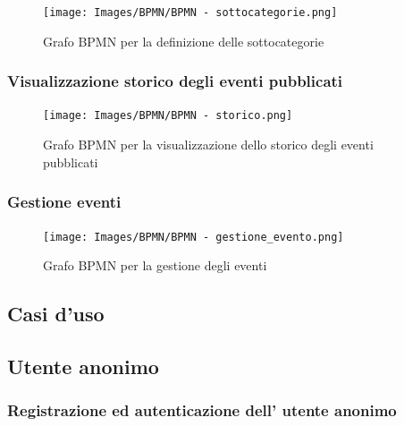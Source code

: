 \documentclass{article}
\begin{document}
\begin{figure}[htbp]
    \label{7.2.1}
    \centering
    \texttt{[image: Images/BPMN/BPMN - sottocategorie.png]}
    \caption{Grafo BPMN per la definizione delle sottocategorie}
\end{figure}
\clearpage

\subsubsection{Visualizzazione storico degli eventi pubblicati}

\begin{figure}[htbp]
    \label{7.2.2}
    \centering
    \texttt{[image: Images/BPMN/BPMN - storico.png]}
    \caption{Grafo BPMN per la visualizzazione dello storico degli eventi pubblicati}
\end{figure}
\clearpage

\subsubsection{Gestione eventi}

\begin{figure}[htbp]
    \label{7.2.3}
    \centering
    \texttt{[image: Images/BPMN/BPMN - gestione\_evento.png]}
    \caption{Grafo BPMN per la gestione degli eventi}
\end{figure}

\clearpage

\subsection{Casi d'uso}

\subsection{Utente anonimo}

\subsubsection{Registrazione ed autenticazione dell' utente anonimo}
\end{document}

